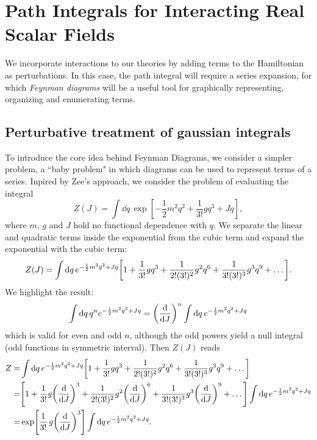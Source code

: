 \chapter{Path Integrals for Interacting Real Scalar Fields}

We incorporate interactions to our theories by adding terms to the Hamiltonian as perturbations. In this case, the path integral will require a series expansion, for which \textit{Feynman diagrams} will be a useful tool for graphically representing, organizing and enumerating terms.
\section{Perturbative treatment of gaussian integrals}
To introduce the core idea behind Feynman Diagrams, we consider a simpler problem, a ``baby problem" in which diagrams can be used to represent terms of a series. Inpired by Zee's \cite{zee2010quantum} approach, we consider the problem of evaluating the integral
\begin{equation}
    Z(J)=\int\dd q\, \exp[-\frac{1}{2}m^2q^2+\frac{1}{3!}gq^3+Jq],
    \label{z_toy}
\end{equation}
where $m$, $g$ and $J$ hold no functional dependence with $q$. We separate the linear and quadratic terms inside the exponential from the cubic term and expand the exponential with the cubic term:
\begin{equation}
      Z(J)=\int\dd q\, e^{-\frac{1}{2}m^2q^2+Jq}\qty[1+\frac{1}{3!}gq^3+\frac{1}{2!(3!)^2}g^2q^6+\frac{1}{3!(3!)^3}g^3q^9+\dots].
\end{equation}
We highlight the result:
\begin{equation}
    \int\dd q\, q^{n}e^{-\frac{1}{2}m^2q^2+Jq}=\qty(\dv{J})^{n}\int\dd q\,e^{-\frac{1}{2}m^2q^2+Jq}
\end{equation}
which is valid for even and odd $n$, although the odd powers yield a null integral (odd functions in symmetric interval). Then $Z(J)$ reads
\begin{equation}
\begin{aligned}
      Z=&\int\dd q\, e^{-\frac{1}{2}m^2q^2+Jq}\qty[1+\frac{1}{3!}gq^3+\frac{1}{2!(3!)^2}g^2q^6+\frac{1}{3!(3!)^3}g^3q^9+\dots]\\
      =&\qty[1+\frac{1}{3!}g\qty(\dv{J})^3+\frac{1}{2!(3!)^2}g^2\qty(\dv{J})^6+\frac{1}{3!(3!)^3}g^3\qty(\dv{J})^9+\dots]\int\dd q\, e^{-\frac{1}{2}m^2q^2+Jq}\\
      =&\exp[\frac{1}{3!}\,g\qty(\dv{J})^3]\int\dd q\, e^{-\frac{1}{2}m^2q^2+Jq}.
\end{aligned}      
\label{interac_out}
\end{equation}
